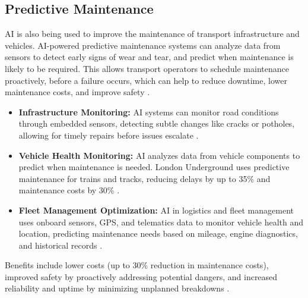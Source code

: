 \subsection{Predictive Maintenance}
AI is also being used to improve the maintenance of transport infrastructure and vehicles. AI-powered predictive maintenance systems can analyze data from sensors to detect early signs of wear and tear, and predict when maintenance is likely to be required. This allows transport operators to schedule maintenance proactively, before a failure occurs, which can help to reduce downtime, lower maintenance costs, and improve safety \cite{abduljabbar2019applications}.
\begin{itemize}
    \item \textbf{Infrastructure Monitoring:} AI systems can monitor road conditions through embedded sensors, detecting subtle changes like cracks or potholes, allowing for timely repairs before issues escalate \cite{Binmile_PredictiveMaintenance}.
    \item \textbf{Vehicle Health Monitoring:} AI analyzes data from vehicle components to predict when maintenance is needed. London Underground uses predictive maintenance for trains and tracks, reducing delays by up to 35\% and maintenance costs by 30\% \cite{BlockchainCouncil_PredictiveMaintenance}.
    \item \textbf{Fleet Management Optimization:} AI in logistics and fleet management uses onboard sensors, GPS, and telematics data to monitor vehicle health and location, predicting maintenance needs based on mileage, engine diagnostics, and historical records \cite{NeuralConcept_PredictiveMaintenance}.
\end{itemize}
Benefits include lower costs (up to 30\% reduction in maintenance costs), improved safety by proactively addressing potential dangers, and increased reliability and uptime by minimizing unplanned breakdowns \cite{Moldstud_PredictiveMaintenance, AppInventiv_PredictiveMaintenance}.


